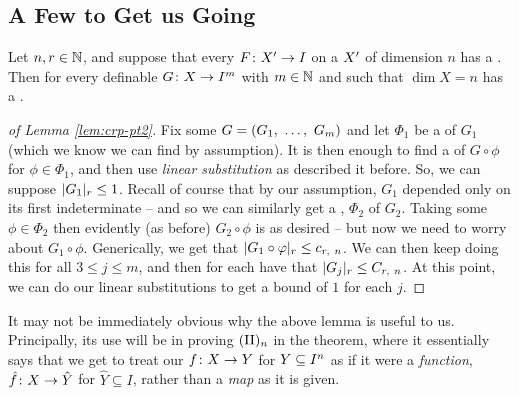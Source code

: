 \subsection{A Few \Lemmas to Get us Going}

\begin{lemma}
  Let $n, r \in \N$, and suppose that every $\funcdom{F}{\pri{X}}{I}$  on a  $\pri{X}$ of dimension $n$ has a \cellrparam. Then for every definable $\funcdom{G}{X}{I^m}$ with $m \in \N$ and such that $\dim{X} = n$ has a \cellrparam.
  \label{lem:crp-pt2}
\end{lemma}

\begin{proof}[of Lemma \ref{lem:crp-pt2}]
  Fix some $G = (\vonevm{G}{m})$ and let $\Phi_1$ be a \cellrparam of $G_1$ (which we know we can find by assumption). It is then enough to find a \cellrparam of $G \circ \phi$ for $\phi \in \Phi_1$, and then use \emph{linear substitution} as described it before. So, we can suppose $\rnorm{G_1} \leq 1$. Recall of course that by our assumption, $G_1$ depended only on its first indeterminate -- and so we can similarly get a \cellrparam, $\Phi_2$ of $G_2$. Taking some $\phi \in \Phi_2$ then evidently (as before) $G_2 \circ \phi$ is as desired -- but now we need to worry about $G_1 \circ \phi$. Generically, we get that $\rnorm{G_1 \circ \phi} \leq c_{r, \ n}$. We can then keep doing this for all $3 \leq j \leq m$, and then for each have that $\rnorm{G_j} \leq C_{r, \ n}$. At this point, we can do our linear substitutions to get a bound of $1$ for each $j$.
\end{proof}

\begin{remark}
  It may not be immediately obvious why the above lemma is useful to us. Principally, its use will be in proving $\IIn$ in the theorem, where it essentially says that we get to treat our $\funcdom{f}{X}{Y}$ for $\CIn[Y]{n}$ as if it were a \emph{function}, $\funcdom{\hat{f}}{X}{\hat{Y}}$ for $\hat{Y} \subseteq I$, rather than a \emph{map} as it is given.
\end{remark}


